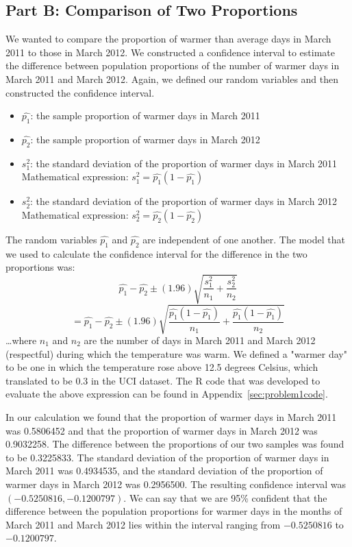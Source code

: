 \documentclass[11pt]{article}
\begin{document}
\subsection{Part B: Comparison of Two Proportions}
\label{subsec:1b}
We wanted to compare the proportion of warmer than average days in March 2011 to those in March 2012. We constructed a confidence interval to estimate the difference between population proportions of the number of warmer days in March 2011 and March 2012. Again, we defined our random variables and then constructed the confidence interval. 
\begin{itemize}
	\item $\hat{p_1}$: the sample proportion of warmer days in March 2011
	\item $\hat{p_2}$: the sample proportion of warmer days in March 2012
	\item $s_{1}^{2}$: the standard deviation of the proportion of warmer days in March 2011
		\subitem Mathematical expression: $s_{1}^{2} =\hat{p_1}(1 - \hat{p_1})$
	\item $s_{2}^{2}$: the standard deviation of the proportion of warmer days in March 2012
		\subitem Mathematical expression: $s_{2}^{2} = \hat{p_2}(1 - \hat{p_2})$
\end{itemize}
The random variables $\hat{p_1}$ and $\hat{p_2}$ are independent of one another. The model that we used to calculate the confidence interval for the difference in the two proportions was:
\begin{equation}
\hat{p_1} - \hat{p_2} \pm (1.96) \sqrt{\frac{s_1^2}{n_1}+\frac{s_2^2}{n_2}} 
\end{equation}
\begin{equation}
= \hat{p_1} - \hat{p_2} \pm (1.96) \sqrt{\frac{\hat{p_1}(1 - \hat{p_1})}{n_1}+\frac{\hat{p_1}(1 - \hat{p_1})}{n_2}}
\end{equation}
\dots where $n_1$ and $n_2$ are the number of days in March 2011 and March 2012 (respectful) during which the temperature was warm. We defined a "warmer day" to be one in which the temperature rose above 12.5 degrees Celsius, which translated to be 0.3 in the UCI dataset. The R code that was developed to evaluate the above expression can be found in Appendix~\ref{sec:problem1code}.

In our calculation we found that the proportion of warmer days in March 2011 was 0.5806452 and that the proportion of warmer days in March 2012 was 0.9032258. The difference between the proportions of our two samples was found to be 0.3225833. The standard deviation of the proportion of warmer days in March 2011 was 0.4934535, and the standard deviation of the proportion of warmer days in March 2012 was 0.2956500. The resulting confidence interval was $(-0.5250816, -0.1200797)$. We can say that we are 95\% confident that the difference between the population proportions for warmer days in the months of March 2011 and March 2012 lies within the interval ranging from $-0.5250816$ to  $-0.1200797$.
\end{document}
